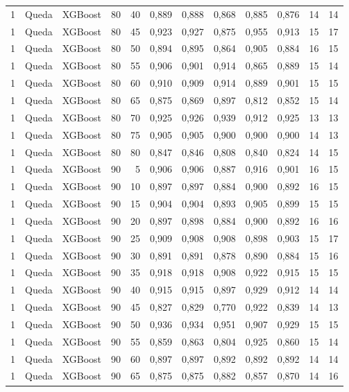 \begin{longtable}{@{}rllrrrrrrrrr@{}}
1 & Queda & XGBoost & 80 & 40 & 0,889 & 0,888 & 0,868 & 0,885 & 0,876 & 14 & 14 \\
1 & Queda & XGBoost & 80 & 45 & 0,923 & 0,927 & 0,875 & 0,955 & 0,913 & 15 & 17 \\
1 & Queda & XGBoost & 80 & 50 & 0,894 & 0,895 & 0,864 & 0,905 & 0,884 & 16 & 15 \\
1 & Queda & XGBoost & 80 & 55 & 0,906 & 0,901 & 0,914 & 0,865 & 0,889 & 15 & 14 \\
1 & Queda & XGBoost & 80 & 60 & 0,910 & 0,909 & 0,914 & 0,889 & 0,901 & 15 & 15 \\
1 & Queda & XGBoost & 80 & 65 & 0,875 & 0,869 & 0,897 & 0,812 & 0,852 & 15 & 14 \\
1 & Queda & XGBoost & 80 & 70 & 0,925 & 0,926 & 0,939 & 0,912 & 0,925 & 13 & 13 \\
1 & Queda & XGBoost & 80 & 75 & 0,905 & 0,905 & 0,900 & 0,900 & 0,900 & 14 & 13 \\
1 & Queda & XGBoost & 80 & 80 & 0,847 & 0,846 & 0,808 & 0,840 & 0,824 & 14 & 15 \\
1 & Queda & XGBoost & 90 & 5 & 0,906 & 0,906 & 0,887 & 0,916 & 0,901 & 16 & 15 \\
1 & Queda & XGBoost & 90 & 10 & 0,897 & 0,897 & 0,884 & 0,900 & 0,892 & 16 & 15 \\
1 & Queda & XGBoost & 90 & 15 & 0,904 & 0,904 & 0,893 & 0,905 & 0,899 & 15 & 15 \\
1 & Queda & XGBoost & 90 & 20 & 0,897 & 0,898 & 0,884 & 0,900 & 0,892 & 16 & 16 \\
1 & Queda & XGBoost & 90 & 25 & 0,909 & 0,908 & 0,908 & 0,898 & 0,903 & 15 & 17 \\
1 & Queda & XGBoost & 90 & 30 & 0,891 & 0,891 & 0,878 & 0,890 & 0,884 & 15 & 16 \\
1 & Queda & XGBoost & 90 & 35 & 0,918 & 0,918 & 0,908 & 0,922 & 0,915 & 15 & 15 \\
1 & Queda & XGBoost & 90 & 40 & 0,915 & 0,915 & 0,897 & 0,929 & 0,912 & 14 & 14 \\
1 & Queda & XGBoost & 90 & 45 & 0,827 & 0,829 & 0,770 & 0,922 & 0,839 & 14 & 13 \\
1 & Queda & XGBoost & 90 & 50 & 0,936 & 0,934 & 0,951 & 0,907 & 0,929 & 15 & 15 \\
1 & Queda & XGBoost & 90 & 55 & 0,859 & 0,863 & 0,804 & 0,925 & 0,860 & 15 & 14 \\
1 & Queda & XGBoost & 90 & 60 & 0,897 & 0,897 & 0,892 & 0,892 & 0,892 & 14 & 14 \\
1 & Queda & XGBoost & 90 & 65 & 0,875 & 0,875 & 0,882 & 0,857 & 0,870 & 14 & 16 \\

\end{longtable}
